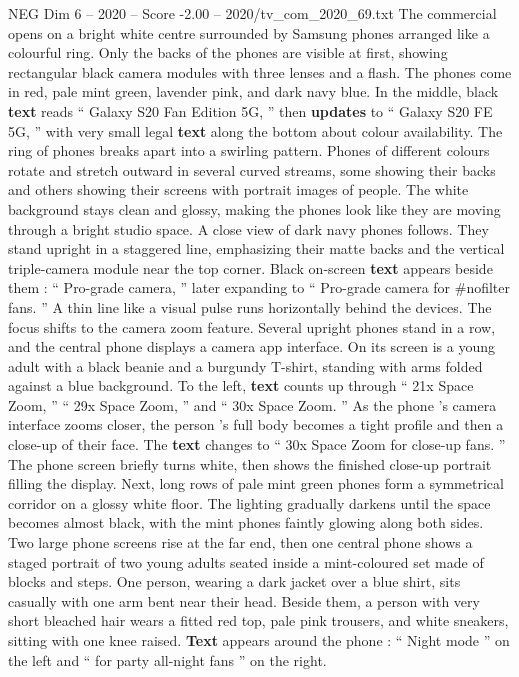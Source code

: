 \begin{textsample}{NEG Dim 6 – 2020 – Score -2.00 – 2020/tv\_com\_2020\_69.txt}  \label{ex:f6_neg_040}
The commercial opens on a bright white centre surrounded by Samsung phones arranged like a colourful ring.
Only the backs of the phones are visible at first, showing rectangular black camera modules with three lenses and a flash.
The phones come in red, pale mint green, lavender pink, and dark navy blue.
In the middle, black \textbf{text} reads “ Galaxy S20 Fan Edition 5G, ” then \textbf{updates} to “ Galaxy S20 FE 5G, ” with very small legal \textbf{text} along the bottom about colour availability.
The ring of phones breaks apart into a swirling pattern.
Phones of different colours rotate and stretch outward in several curved streams, some showing their backs and others showing their screens with portrait images of people.
The white background stays clean and glossy, making the phones look like they are moving through a bright studio space.
A close view of dark navy phones follows.
They stand upright in a staggered line, emphasizing their matte backs and the vertical triple-camera module near the top corner.
Black on-screen \textbf{text} appears beside them : “ Pro-grade camera, ” later expanding to “ Pro-grade camera for \#nofilter fans. ” A thin line like a visual pulse runs horizontally behind the devices.
The focus shifts to the camera zoom feature.
Several upright phones stand in a row, and the central phone displays a camera app interface.
On its screen is a young adult with a black beanie and a burgundy T-shirt, standing with arms folded against a blue background.
To the left, \textbf{text} counts up through “ 21x Space Zoom, ” “ 29x Space Zoom, ” and “ 30x Space Zoom. ” As the phone ’s camera interface zooms closer, the person ’s full body becomes a tight profile and then a close-up of their face.
The \textbf{text} changes to “ 30x Space Zoom for close-up fans. ” The phone screen briefly turns white, then shows the finished close-up portrait filling the display.
Next, long rows of pale mint green phones form a symmetrical corridor on a glossy white floor.
The lighting gradually darkens until the space becomes almost black, with the mint phones faintly glowing along both sides.
Two large phone screens rise at the far end, then one central phone shows a staged portrait of two young adults seated inside a mint-coloured set made of blocks and steps.
One person, wearing a dark jacket over a blue shirt, sits casually with one arm bent near their head.
Beside them, a person with very short bleached hair wears a fitted red top, pale pink trousers, and white sneakers, sitting with one knee raised. \textbf{Text} appears around the phone : “ Night mode ” on the left and “ for party all-night fans ” on the right.

\end{textsample}
